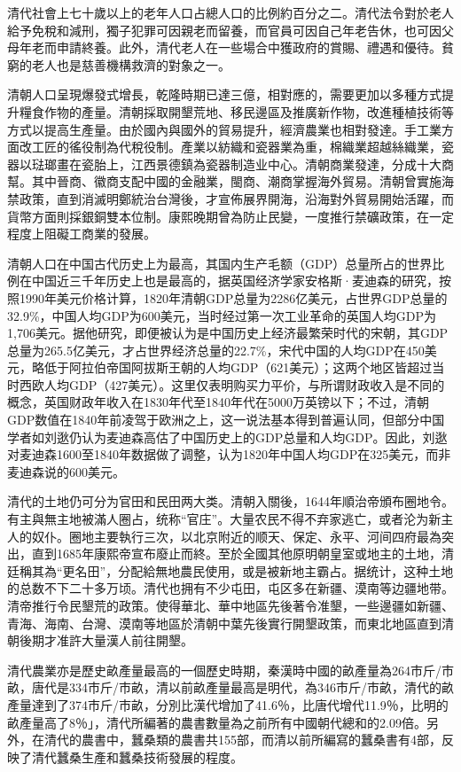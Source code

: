 清代社會上七十歲以上的老年人口占總人口的比例約百分之二。清代法令對於老人給予免稅和減刑，獨子犯罪可因親老而留養，而官員可因自己年老告休，也可因父母年老而申請終養。此外，清代老人在一些場合中獲政府的賞賜、禮遇和優待。貧窮的老人也是慈善機構救濟的對象之一。


清朝人口呈現爆發式增長，乾隆時期已達三億，相對應的，需要更加以多種方式提升糧食作物的產量。清朝採取開墾荒地、移民邊區及推廣新作物，改進種植技術等方式以提高生產量。由於國內與國外的貿易提升，經濟農業也相對發達。手工業方面改工匠的徭役制為代稅役制。產業以紡織和瓷器業為重，棉織業超越絲織業，瓷器以琺瑯畫在瓷胎上，江西景德鎮為瓷器制造业中心。清朝商業發達，分成十大商幫。其中晉商、徽商支配中國的金融業，閩商、潮商掌握海外貿易。清朝曾實施海禁政策，直到消滅明鄭統治台灣後，才宣佈展界開海，沿海對外貿易開始活躍，而貨幣方面則採銀銅雙本位制。康熙晚期曾為防止民變，一度推行禁礦政策，在一定程度上阻礙工商業的發展。

清朝人口在中国古代历史上为最高，其国内生产毛额（GDP）总量所占的世界比例在中国近三千年历史上也是最高的，据英国经济学家安格斯·麦迪森的研究，按照1990年美元价格计算，1820年清朝GDP总量为2286亿美元，占世界GDP总量的32.9\%，中国人均GDP为600美元，当时经过第一次工业革命的英国人均GDP为1,706美元。据他研究，即便被认为是中国历史上经济最繁荣时代的宋朝，其GDP总量为265.5亿美元，才占世界经济总量的22.7\%，宋代中国的人均GDP在450美元，略低于阿拉伯帝国阿拔斯王朝的人均GDP（621美元）；这两个地区皆超过当时西欧人均GDP（427美元）。这里仅表明购买力平价，与所谓财政收入是不同的概念，英国财政年收入在1830年代至1840年代在5000万英镑以下；不过，清朝GDP数值在1840年前凌驾于欧洲之上，这一说法基本得到普遍认同，但部分中国学者如刘逖仍认为麦迪森高估了中国历史上的GDP总量和人均GDP。因此，刘逖对麦迪森1600至1840年数据做了调整，认为1820年中国人均GDP在325美元，而非麦迪森说的600美元。

清代的土地仍可分为官田和民田两大类。清朝入關後，1644年順治帝頒布圈地令。有主與無主地被滿人圈占，统称“官庄”。大量农民不得不弃家逃亡，或者沦为新主人的奴仆。圈地主要執行三次，以北京附近的顺天、保定、永平、河间四府最為突出，直到1685年康熙帝宣布廢止而終。至於全國其他原明朝皇室或地主的土地，清廷稱其為“更名田”，分配給無地農民使用，或是被新地主霸占。据统计，这种土地的总数不下二十多万顷。清代也拥有不少屯田，屯区多在新疆、漠南等边疆地带。清帝推行令民墾荒的政策。使得華北、華中地區先後著令准墾，一些邊疆如新疆、青海、海南、台灣、漠南等地區於清朝中葉先後實行開墾政策，而東北地區直到清朝後期才准許大量漢人前往開墾。

清代農業亦是歷史畝產量最高的一個歷史時期，秦漢時中國的畝產量為264市斤/市畝，唐代是334市斤/市畝，清以前畝產量最高是明代，為346市斤/市畝，清代的畝產量達到了374市斤/市畝，分別比漢代增加了41.6％，比唐代增代11.9％，比明的畝產量高了8％」，清代所編著的農書數量為之前所有中國朝代總和的2.09倍。另外，在清代的農書中，蠶桑類的農書共155部，而清以前所編寫的蠶桑書有4部，反映了清代蠶桑生產和蠶桑技術發展的程度。

